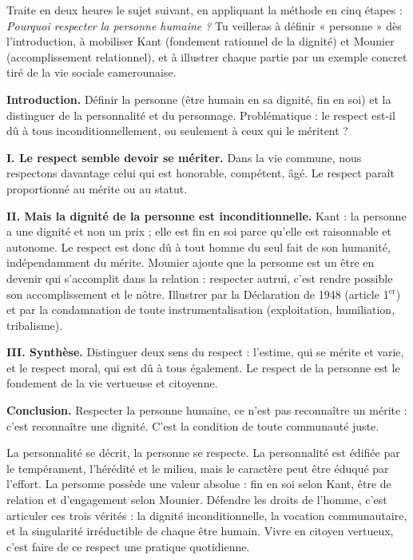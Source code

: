 \documentclass[11pt]{article}
\begin{document}
\begin{exercice}
Traite en deux heures le sujet suivant, en appliquant la méthode en cinq étapes : \emph{Pourquoi respecter la personne humaine ?} Tu veilleras à définir « personne » dès l'introduction, à mobiliser Kant (fondement rationnel de la dignité) et Mounier (accomplissement relationnel), et à illustrer chaque partie par un exemple concret tiré de la vie sociale camerounaise.
\end{exercice}

\begin{corrige}
\textbf{Introduction.} Définir la personne (être humain en sa dignité, fin en soi) et la distinguer de la personnalité et du personnage. Problématique : le respect est-il dû à tous inconditionnellement, ou seulement à ceux qui le méritent ?

\textbf{I. Le respect semble devoir se mériter.} Dans la vie commune, nous respectons davantage celui qui est honorable, compétent, âgé. Le respect paraît proportionné au mérite ou au statut.

\textbf{II. Mais la dignité de la personne est inconditionnelle.} Kant : la personne a une dignité et non un prix ; elle est fin en soi parce qu'elle est raisonnable et autonome. Le respect est donc dû à tout homme du seul fait de son humanité, indépendamment du mérite. Mounier ajoute que la personne est un être en devenir qui s'accomplit dans la relation : respecter autrui, c'est rendre possible son accomplissement et le nôtre. Illustrer par la Déclaration de 1948 (article 1$^{\text{er}}$) et par la condamnation de toute instrumentalisation (exploitation, humiliation, tribalisme).

\textbf{III. Synthèse.} Distinguer deux sens du respect : l'estime, qui se mérite et varie, et le respect moral, qui est dû à tous également. Le respect de la personne est le fondement de la vie vertueuse et citoyenne.

\textbf{Conclusion.} Respecter la personne humaine, ce n'est pas reconnaître un mérite : c'est reconnaître une dignité. C'est la condition de toute communauté juste.
\end{corrige}

\begin{aretenir}
La personnalité se décrit, la personne se respecte. La personnalité est édifiée par le tempérament, l'hérédité et le milieu, mais le caractère peut être éduqué par l'effort. La personne possède une valeur absolue : fin en soi selon Kant, être de relation et d'engagement selon Mounier. Défendre les droits de l'homme, c'est articuler ces trois vérités : la dignité inconditionnelle, la vocation communautaire, et la singularité irréductible de chaque être humain. Vivre en citoyen vertueux, c'est faire de ce respect une pratique quotidienne.
\end{aretenir}
\end{document}
